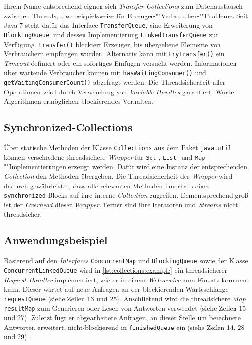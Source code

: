\documentclass[a4paper, 11pt]{article}
\begin{document}
Ihrem Name entsprechend eignen sich \textit{Transfer-Collections} zum Datenaustausch zwischen Threads, also beispielsweise für Erzeuger-""Verbraucher-""Probleme.
Seit Java 7 steht dafür das Interface \verb|TransferQueue|, eine Erweiterung von \verb|BlockingQueue|, und dessen Implementierung \verb|LinkedTransferQueue| zur Verfügung.
\verb|transfer()| blockiert Erzeuger, bis übergebene Elemente von Verbrauchern empfangen wurden.
Alternativ kann mit \verb|tryTransfer()| ein \textit{Timeout} definiert oder ein sofortiges Einfügen versucht werden.
Informationen über wartende Verbraucher können mit \verb|hasWaitingConsumer()| und \verb|getWaitingConsumerCount()| abgefragt werden.
Die Threadsicherheit aller Operationen wird durch Verwendung von \textit{Variable Handles} garantiert.
Warte-Algorithmen ermöglichen blockierendes Verhalten.

\subsection{Synchronized-Collections}
\label{subsec:collections:synchronized}

Über statische Methoden der Klasse \verb|Collections| aus dem Paket \verb|java.util| können verschiedene threadsichere \textit{Wrapper} für \verb|Set|-, \verb|List|- und \verb|Map|-""Implementierungen erzeugt werden.
Dafür wird eine Instanz der entsprechenden \textit{Collection} den Methoden übergeben.
Die Threadsicherheit der \textit{Wrapper} wird dadurch gewährleistet, dass alle relevanten Methoden innerhalb eines \verb|synchronized|-Blocks auf ihre interne \textit{Collection} zugreifen.
Dementsprechend groß ist der \textit{Overhead} dieser \textit{Wrapper}.
Ferner sind ihre Iteratoren und \textit{Streams} nicht threadsicher.

\subsection{Anwendungsbeispiel}
\label{subsec:collections:example}

Basierend auf den \textit{Interfaces} \verb|ConcurrentMap| und \verb|BlockingQueue| sowie der Klasse \verb|ConcurrentLinkedQueue| wird in \autoref{lst:collections:example} ein threadsicherer \textit{Request Handler} implementiert, wie er in einem \textit{Webservice} zum Einsatz kommen kann.
Dieser wartet auf neue Anfragen an der blockierenden Warteschlange \verb|requestQueue| (siehe Zeilen 13 und 25).
Anschließend wird die threadsichere \textit{Map} \verb|resultMap| zum Generieren oder Lesen von Antworten verwendet (siehe Zeilen 15 und 27).
Zuletzt fügt er abgearbeitete Anfragen, an dieser Stelle um berechnete Antworten erweitert, nicht-blockierend in \verb|finishedQueue| ein (siehe Zeilen 14, 28 und 29).
\end{document}
